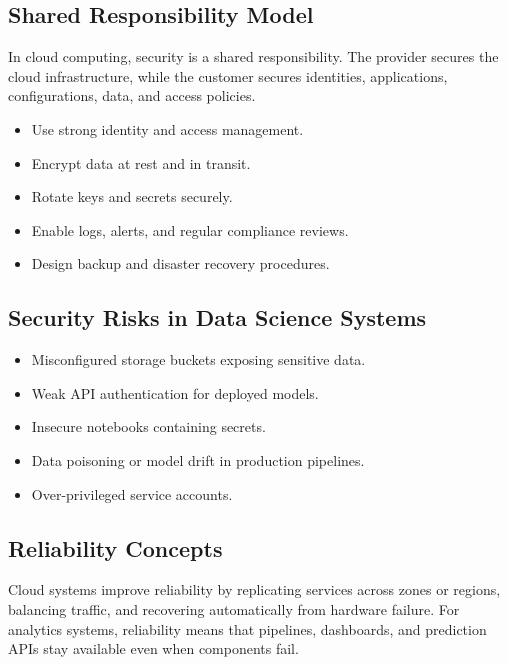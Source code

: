 \documentclass[11pt,a4paper]{article}
\begin{document}
\subsection{Shared Responsibility Model}

\begin{definitionbox}
In cloud computing, security is a shared responsibility. The provider secures the cloud infrastructure, while the customer secures identities, applications, configurations, data, and access policies.
\end{definitionbox}

\begin{itemize}[leftmargin=*]
  \item Use strong identity and access management.
  \item Encrypt data at rest and in transit.
  \item Rotate keys and secrets securely.
  \item Enable logs, alerts, and regular compliance reviews.
  \item Design backup and disaster recovery procedures.
\end{itemize}

\subsection{Security Risks in Data Science Systems}

\begin{itemize}[leftmargin=*]
  \item Misconfigured storage buckets exposing sensitive data.
  \item Weak API authentication for deployed models.
  \item Insecure notebooks containing secrets.
  \item Data poisoning or model drift in production pipelines.
  \item Over-privileged service accounts.
\end{itemize}

\subsection{Reliability Concepts}

\begin{conceptbox}
Cloud systems improve reliability by replicating services across zones or regions, balancing traffic, and recovering automatically from hardware failure. For analytics systems, reliability means that pipelines, dashboards, and prediction APIs stay available even when components fail.
\end{conceptbox}
\end{document}
